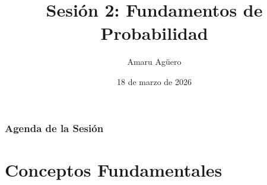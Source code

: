 \documentclass[aspectratio=169,11pt]{beamer}
\institute[CICS — UDD]{Doctorado en Ciencias de la Complejidad Social — CICS, UDD}
\date{18 de marzo de 2026}
\title{Sesión 2: Fundamentos de Probabilidad}
\author[A. Agüero]{Amaru Agüero}
\begin{document}
\frame{\titlepage}

\begin{frame}[fragile]
\frametitle{Agenda de la Sesión}
\tableofcontents
\end{frame}

\section{Conceptos Fundamentales}
\end{document}
